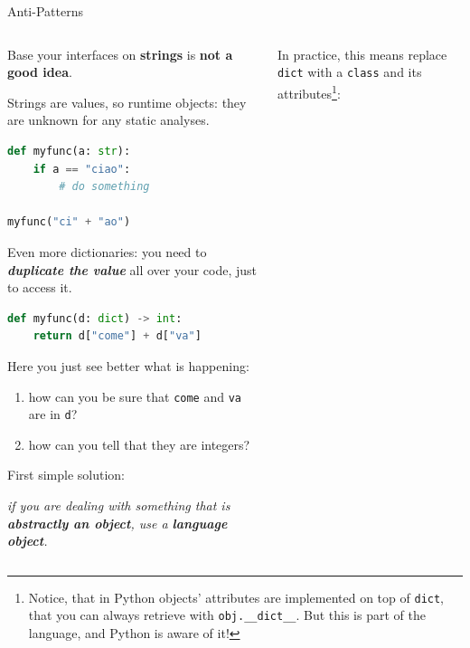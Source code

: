 \documentclass[9pt]{beamer}
\begin{document}
\begin{frame}[fragile]{Anti-Patterns}
    \vspace*{30pt}
    \begin{columns}
        \begin{column}{0.5\textwidth}
            Base your interfaces on \textbf{strings} is \textbf{not a good
            idea}.

            Strings are values, so runtime objects: they are unknown for any
            static analyses.

            \begin{lstlisting}[language=Python,style=mystyle]
def myfunc(a: str):
    if a == "ciao":
        # do something

myfunc("ci" + "ao")\end{lstlisting}
            \vspace*{10pt}

            Even more dictionaries: you need to \textit{\textbf{duplicate the
            value}} all over your code, just to access it.

            \begin{lstlisting}[language=Python,style=mystyle]
def myfunc(d: dict) -> int:
    return d["come"] + d["va"]\end{lstlisting}

            Here you just see better what is happening:

            \begin{enumerate}
                \item how can you be sure that \texttt{come} and \texttt{va}
                    are in \texttt{d}?
                \item how can you tell that they are integers?
            \end{enumerate}
            \vspace*{10pt}

            First simple solution: 
            \begin{center}
                \itshape
                if you are dealing with something that is \textbf{abstractly an
                object}, use a \textbf{language object}.
            \end{center}
        \end{column}
        \begin{column}{0.5\textwidth}
            In practice, this means replace \texttt{dict} with a \texttt{class}
            and its attributes\footnote{
                Notice, that in Python objects' attributes are implemented on
                top of \texttt{dict}, that you can always retrieve with
                \texttt{obj.\_\_dict\_\_}. But this is part of the language,
                and Python is aware of it!
            }:



\end{column}
\end{columns}
\end{frame}
\end{document}
